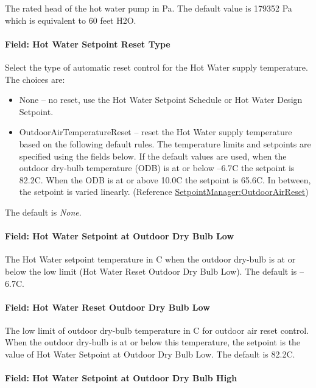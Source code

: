 The rated head of the hot water pump in Pa. The default value is 179352 Pa which is equivalent to 60 feet H2O.

\paragraph{Field: Hot Water Setpoint Reset Type}\label{field-hot-water-setpoint-reset-type}

Select the type of automatic reset control for the Hot Water supply temperature. The choices are:

\begin{itemize}
\item
  None -- no reset, use the Hot Water Setpoint Schedule or Hot Water Design Setpoint.
\item
  OutdoorAirTemperatureReset -- reset the Hot Water supply temperature based on the following default rules. The temperature limits and setpoints are specified using the fields below. If the default values are used, when the outdoor dry-bulb temperature (ODB) is at or below --6.7C the setpoint is 82.2C. When the ODB is at or above 10.0C the setpoint is 65.6C. In between, the setpoint is varied linearly. (Reference \hyperref[setpointmanageroutdoorairreset]{SetpointManager:OutdoorAirReset})
\end{itemize}

The default is \emph{None}.

\paragraph{Field: Hot Water Setpoint at Outdoor Dry Bulb Low}\label{field-hot-water-setpoint-at-outdoor-dry-bulb-low}

The Hot Water setpoint temperature in C when the outdoor dry-bulb is at or below the low limit (Hot Water Reset Outdoor Dry Bulb Low). The default is --6.7C.

\paragraph{Field: Hot Water Reset Outdoor Dry Bulb Low}\label{field-hot-water-reset-outdoor-dry-bulb-low}

The low limit of outdoor dry-bulb temperature in C for outdoor air reset control. When the outdoor dry-bulb is at or below this temperature, the setpoint is the value of Hot Water Setpoint at Outdoor Dry Bulb Low. The default is 82.2C.

\paragraph{Field: Hot Water Setpoint at Outdoor Dry Bulb High}\label{field-hot-water-setpoint-at-outdoor-dry-bulb-high}

